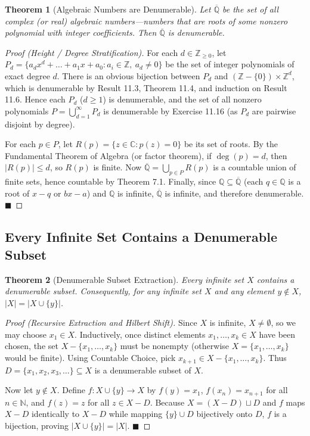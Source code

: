 \documentclass[11pt, letterpaper]{article}
\newtheorem{theorem}{Theorem}[section]
\theoremstyle{definition}
\theoremstyle{remark}
\begin{document}
\begin{theorem}[Algebraic Numbers are Denumerable]
Let $\overline{\mathbb{Q}}$ be the set of all complex (or real) algebraic numbers---numbers that are roots of some nonzero polynomial with integer coefficients. Then $\overline{\mathbb{Q}}$ is denumerable.
\end{theorem}

\begin{proof}[Proof (Height / Degree Stratification)]
For each $d \in \mathbb{Z}_{\geq 0}$, let $P_d = \{a_d x^d + \dots + a_1 x + a_0 : a_i \in \mathbb{Z},\ a_d \neq 0\}$ be the set of integer polynomials of exact degree $d$. There is an obvious bijection between $P_d$ and $(\mathbb{Z} - \{0\}) \times \mathbb{Z}^d$, which is denumerable by Result 11.3, Theorem 11.4, and induction on Result 11.6. Hence each $P_d$ ($d \geq 1$) is denumerable, and the set of all nonzero polynomials $P = \bigcup_{d=1}^\infty P_d$ is denumerable by Exercise 11.16 (as $P_d$ are pairwise disjoint by degree).

For each $p \in P$, let $R(p) = \{z \in \mathbb{C} : p(z) = 0\}$ be its set of roots. By the Fundamental Theorem of Algebra (or factor theorem), if $\deg(p) = d$, then $|R(p)| \leq d$, so $R(p)$ is finite. Now $\overline{\mathbb{Q}} = \bigcup_{p \in P} R(p)$ is a countable union of finite sets, hence countable by Theorem 7.1. Finally, since $\mathbb{Q} \subseteq \overline{\mathbb{Q}}$ (each $q \in \mathbb{Q}$ is a root of $x - q$ or $bx - a$) and $\mathbb{Q}$ is infinite, $\overline{\mathbb{Q}}$ is infinite, and therefore denumerable. $\blacksquare$
\end{proof}

\subsection{Every Infinite Set Contains a Denumerable Subset}

\begin{theorem}[Denumerable Subset Extraction]
Every infinite set $X$ contains a denumerable subset. Consequently, for any infinite set $X$ and any element $y \notin X$, $|X| = |X \cup \{y\}|$.
\end{theorem}

\begin{proof}[Proof (Recursive Extraction and Hilbert Shift)]
Since $X$ is infinite, $X \neq \emptyset$, so we may choose $x_1 \in X$. Inductively, once distinct elements $x_1, \dots, x_k \in X$ have been chosen, the set $X - \{x_1, \dots, x_k\}$ must be nonempty (otherwise $X = \{x_1, \dots, x_k\}$ would be finite). Using Countable Choice, pick $x_{k+1} \in X - \{x_1, \dots, x_k\}$. Thus $D = \{x_1, x_2, x_3, \dots\} \subseteq X$ is a denumerable subset of $X$.

Now let $y \notin X$. Define $f : X \cup \{y\} \to X$ by $f(y) = x_1$, $f(x_n) = x_{n+1}$ for all $n \in \mathbb{N}$, and $f(z) = z$ for all $z \in X - D$. Because $X = (X - D) \sqcup D$ and $f$ maps $X - D$ identically to $X - D$ while mapping $\{y\} \cup D$ bijectively onto $D$, $f$ is a bijection, proving $|X \cup \{y\}| = |X|$. $\blacksquare$
\end{proof}
\end{document}
